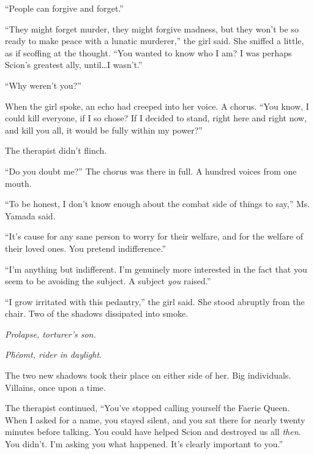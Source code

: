``People can forgive and forget.''



``They might forget murder, they might forgive madness, but they won't be so ready to make peace with a lunatic murderer,'' the girl said.  She sniffed a little, as if scoffing at the thought.  ``You wanted to know who I am?  I was perhaps Scion's greatest ally, until\ldots I wasn't.''



``Why weren't you?''



When the girl spoke, an echo had creeped into her voice.  A chorus.  ``You know, I could kill everyone, if I so chose?  If I decided to stand, right here and right now, and kill you all, it would be fully within my power?''



The therapist didn't flinch.



``Do you doubt me?''  The chorus was there in full.  A hundred voices from one mouth.



``To be honest, I don't know enough about the combat side of things to say,'' Ms. Yamada said.



``It's cause for any sane person to worry for their welfare, and for the welfare of their loved ones.  You pretend indifference.''



``I'm anything but indifferent.  I'm genuinely more interested in the fact that you seem to be avoiding the subject.  A subject \emph{you} raised.''



``I grow irritated with this pedantry,'' the girl said.  She stood abruptly from the chair.  Two of the shadows dissipated into smoke.



\emph{Prolapse, torturer's son.}



\emph{P\=h\^ comt, rider in daylight.}



The two new shadows took their place on either side of her.  Big individuals.  Villains, once upon a time.



The therapist continued, ``You've stopped calling yourself the Faerie Queen.  When I asked for a name, you stayed silent, and you sat there for nearly twenty minutes before talking.  You could have helped Scion and destroyed us all \emph{then}.  You didn't.  I'm asking you what happened.  It's clearly important to you.''



